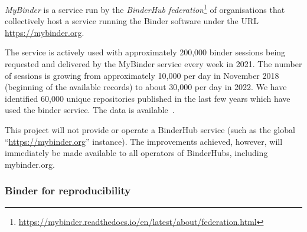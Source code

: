 \emph{MyBinder} is a service run by the \emph{BinderHub
  federation}\footnote{\url{https://mybinder.readthedocs.io/en/latest/about/federation.html}}
of organisations that collectively host a service running the Binder software
under the URL \url{https://mybinder.org}.

The service is actively used with approximately 200,000 binder sessions being
requested and delivered by the MyBinder service every week in 2021. The number
of sessions is growing from approximately 10,000 per day in November 2018
(beginning of the available records) to about 30,000 per day in 2022. We have
identified 60,000 unique repositories published in the last few years which have
used the binder service. The data is available~\cite{mybinder-archive}.

This project will not provide or operate a BinderHub service (such as the global
``\url{https://mybinder.org}'' instance). The improvements achieved, however, will immediately
be made available to all operators of BinderHubs, including mybinder.org.

\subsubsection{Binder for reproducibility}\label{sec:binder-for-reproducibility}




